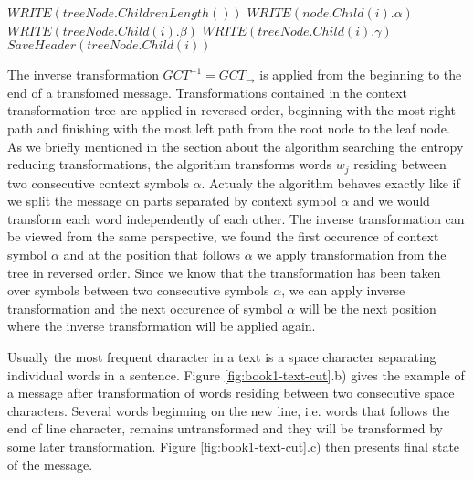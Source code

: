 \documentclass[smallabstract,smallcaptions]{dccpaper}
\begin{document}
\begin{algorithm}[!ht]
\begin{algorithmic}
\State $WRITE(treeNode.ChildrenLength())$
\State $WRITE(node.Child(i).\alpha)$
\Else
\State$ WRITE(treeNode.Child(i).\beta)$
\State $WRITE(treeNode.Child(i).\gamma)$
\EndIf
\State $SaveHeader(treeNode.Child(i))$
\EndFor
\EndFunction
\end{algorithmic}
\caption{\label{fig:gct}%
Recursive header saving algorithm}
\end{algorithm}


The inverse transformation $GCT^{-1} = GCT_{\rightarrow}$ is applied from the beginning to the end of a transfomed message. Transformations contained in the context transformation tree are applied in reversed order, beginning with the most right path and finishing with the most left path from the root node to the leaf node. As we briefly mentioned in the section about the algorithm searching the entropy reducing transformations, the algorithm transforms words $w_j$ residing between two consecutive context symbols $\alpha$. Actualy the algorithm behaves exactly like if we split the message on parts separated by context symbol $\alpha$ and we would transform each word independently of each other. The inverse transformation can be viewed from the same perspective, we found the first occurence of context symbol $\alpha$ and at the position that follows $\alpha$ we apply transformation from the tree in reversed order. Since we know that the transformation has been taken over symbols between two consecutive symbols $\alpha$, we can apply inverse transformation and the next occurence of symbol $\alpha$ will be the next position where the inverse transformation will be applied again.

\label{sec:languages}

Usually the most frequent character in a text is a space character separating individual words in a sentence.
Figure \ref{fig:book1-text-cut}.b) gives the example of a message after transformation of words residing between two consecutive space characters. Several words beginning on the new line, i.e. words that follows the end of line character, remains untransformed and they will be transformed by some later transformation. Figure \ref{fig:book1-text-cut}.c) then presents final state of the message. 
\end{document}
